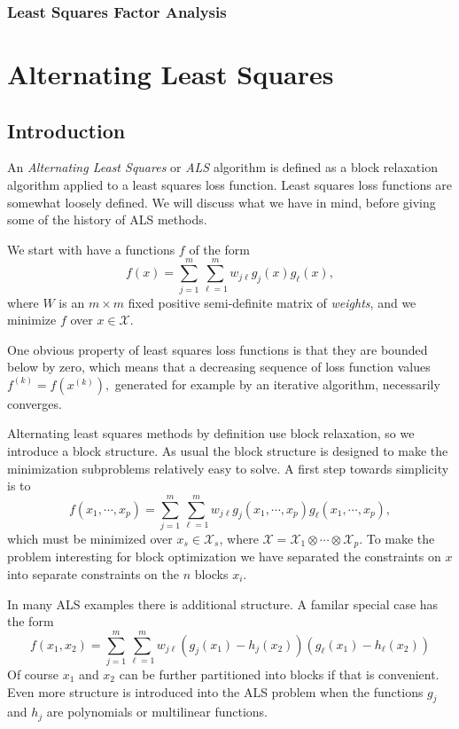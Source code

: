 \documentclass[
  12pt,
]{book}
\begin{document}
\hypertarget{coordinatedescent:examples:leastsquaresfactoranalysis}{%
\subsection{Least Squares Factor Analysis}\label{coordinatedescent:examples:leastsquaresfactoranalysis}}

\hypertarget{alternatingleastsquares}{%
\chapter{Alternating Least Squares}\label{alternatingleastsquares}}

\hypertarget{alternatingleastsquares:introduction}{%
\section{Introduction}\label{alternatingleastsquares:introduction}}

An \emph{Alternating Least Squares} or \emph{ALS} algorithm is defined as a block relaxation algorithm applied to a least squares loss function. Least squares loss functions are somewhat loosely defined. We will discuss what we have in mind, before giving some of the history of ALS methods.

We start with have a functions \(f\) of the form
\[
f(x)=\sum_{j=1}^m\sum_{\ell=1}^m w_{j\ell}g_j(x)g_\ell(x),
\]
where \(W\) is an \(m\times m\) fixed positive semi-definite matrix of \emph{weights}, and we minimize \(f\) over \(x\in\mathcal{X}\).

One obvious property of least squares loss functions is that they are bounded below by zero, which means that a decreasing sequence of loss function values \(f^{(k)}=f(x^{(k)}),\) generated for example by an iterative algorithm, necessarily converges.

Alternating least squares methods by definition use block relaxation, so we introduce a block structure. As usual the block structure is designed to make the minimization subproblems relatively easy to solve. A first step towards simplicity is to
\[
f(x_1,\cdots,x_p)=\sum_{j=1}^m\sum_{\ell=1}^mw_{j\ell}g_j(x_1,\cdots,x_p)g_\ell(x_1,\cdots,x_p),
\]
which must be minimized over \(x_s\in\mathcal{X}_s\), where \(\mathcal{X}=\mathcal{X}_1\otimes\cdots\otimes\mathcal{X}_p\). To make the problem interesting for block optimization we have separated the constraints on \(x\) into separate constraints on the \(n\) blocks \(x_i\).

In many ALS examples there is additional structure. A familar special case has the form
\[
f(x_1,x_2)=\sum_{j=1}^m\sum_{\ell=1}^mw_{j\ell}(g_j(x_1)-h_j(x_2))(g_\ell(x_1)-h_\ell(x_2))
\]
Of course \(x_1\) and \(x_2\) can be further partitioned into blocks if that is convenient. Even more structure is introduced into the ALS problem when the functions \(g_j\) and \(h_j\) are polynomials or multilinear functions.
\end{document}
